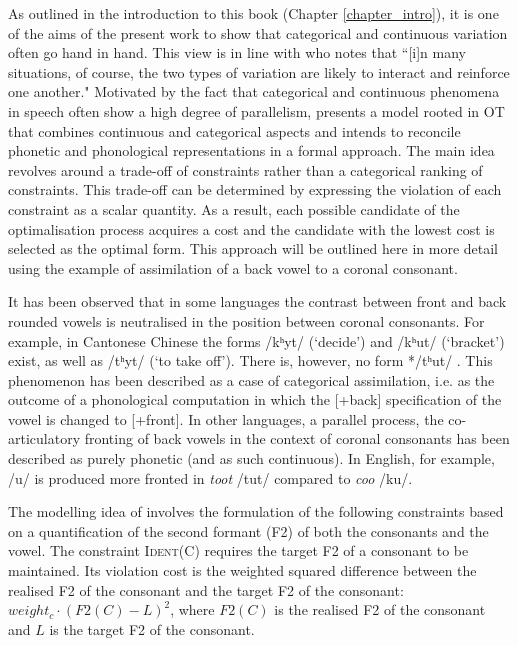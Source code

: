 As outlined in the introduction to this book (Chapter \ref{chapter_intro}), it is one of the aims of the present work to show that categorical and continuous variation often go hand in hand. This view is in line with \citet[88]{Ladd2014} who notes that ``[i]n many situations, of course, the two types of variation are likely to interact and reinforce one another." Motivated by the fact that categorical and continuous phenomena in speech often show a high degree of parallelism, \citet{Flemming2001} presents a model rooted in OT that combines continuous and categorical aspects and intends to reconcile phonetic and phonological representations in a formal approach. The main idea revolves around a trade-off of constraints rather than a categorical ranking of constraints. This trade-off can be determined by expressing the violation of each constraint as a scalar quantity. As a result, each possible candidate of the optimalisation process acquires a cost and the candidate with the lowest cost is selected as the optimal form. This approach will be outlined here in more detail using the example of assimilation of a back vowel to a coronal consonant.

It has been observed that in some languages the contrast between front and back rounded vowels is neutralised in the position between coronal consonants. For example, in Cantonese Chinese the forms /kʰyt/ (`decide') and /kʰut/ (`bracket') exist, as well as /tʰyt/ (`to take off'). There is, however, no form */tʰut/ \citep{Flemming2001}. This phenomenon has been described as a case of categorical assimilation, i.e. as the outcome of a phonological computation in which the  [+back] specification of the vowel is changed to [+front]. In other languages, a parallel process, the co-articulatory fronting of back vowels in the context of coronal consonants has been described as purely phonetic (and as such continuous). In English, for example, /u/ is produced more fronted in \emph{toot} /tut/ compared to \emph{coo} /ku/. 

The modelling idea of \citet{Flemming2001} involves the formulation of the following constraints based on a quantification of the second formant (F2) of both the consonants and the vowel. The constraint \textsc{Ident(C)} requires the target F2 of a consonant to be maintained. Its violation cost is the weighted squared difference between the realised F2 of the consonant and the target F2 of the consonant: $weight_c \cdot (F2(C) - L)^2$, where $F2(C)$ is the realised F2 of the consonant and $L$ is the target F2 of the consonant.

